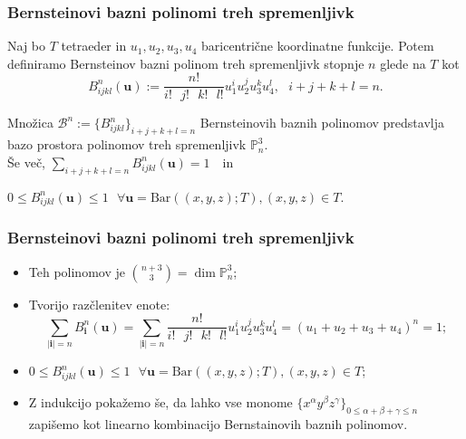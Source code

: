\documentclass[10pt]{beamer}
\theoremstyle{definition}
\begin{document}
  \begin{frame}

    \frametitle{Bernsteinovi bazni polinomi treh spremenljivk}
    Naj bo $T$ tetraeder in $u_1,u_2,u_3,u_4$
    baricentrične koordinatne funkcije.
    Potem definiramo Bernsteinov bazni polinom treh spremenljivk 
    stopnje $n$ glede na $T$ kot 
    $$
    B_{ijkl}^n(\textbf{u}) := \frac{n!}{i!\text{ }j!\text{ }k!\text{ }l!}u_1^iu_2^ju_3^ku_4^l,\text{    }i+j+k+l=n.
    $$
    \pause
    \begin{block}{}    
        Množica $\mathcal{B}^n := \{B_{ijkl}^n\}_{i+j+k+l=n}$
        Bernsteinovih baznih polinomov predstavlja bazo 
        prostora polinomov treh spremenljivk $\mathbb{P}^3_n$.\\
        \vspace{0.2cm}
        Še več,
        $
        \sum_{i+j+k+l=n}B^n_{ijkl}(\textbf{u})=1\text{ }
        $
        in

        \vspace{0.2cm}
        $
        0\leq B_{ijkl}^n(\textbf{u})\leq 1\text{ }\forall \textbf{u}=\text{Bar}{((x,y,z);T)}, (x,y,z)\in T.
        $
    \end{block}
  \end{frame}

  \begin{frame}

    \frametitle{Bernsteinovi bazni polinomi treh spremenljivk}
    \begin{itemize}
      \item Teh polinomov je $\binom{n+3}{3} = \dim{\mathbb{P}^3_n}$;\pause
      \item Tvorijo razčlenitev enote: 
      $$\sum_{|\textbf{i}|=n}B_{\textbf{i}}^n(\textbf{u})=
      \sum_{|\textbf{i}|=n}\frac{n!}{i!\text{ }j!\text{ }k!\text{ }l!}u_1^iu_2^ju_3^ku_4^l=
      (u_1+u_2+u_3+u_4)^n = 1;
      $$\pause
      \item $0\leq B_{ijkl}^n(\textbf{u})\leq 1\text{ }\forall \textbf{u}=\text{Bar}{((x,y,z);T)}, (x,y,z)\in T$;\pause
      \item Z indukcijo pokažemo še, 
      da lahko vse monome $\{x^\alpha y^\beta z^\gamma\}_{0\leq \alpha+\beta+\gamma\leq n}$ 
      zapišemo kot linearno kombinacijo Bernstainovih baznih polinomov.
    
      
    \end{itemize}
  \end{frame}
\end{document}
